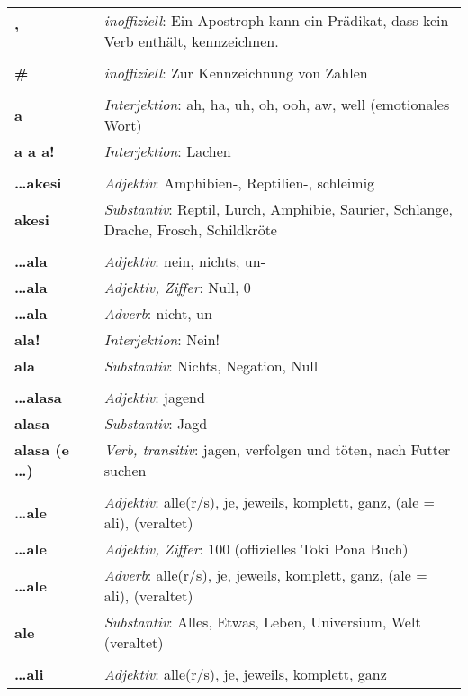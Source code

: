 \begin{supertabular}{p{2,5cm}|ll}
\textbf{'} && \textit{inoffiziell}: Ein Apostroph kann ein Prädikat, dass kein Verb enthält, kennzeichnen.  \\ 
 && \\ %
\textbf{\#} && \textit{inoffiziell}: Zur Kennzeichnung von Zahlen \\ 
 && \\ %
\textbf{a} && \textit{Interjektion}: ah, ha, uh, oh, ooh, aw, well  (emotionales Wort) \\ 
\textbf{a a a!} && \textit{Interjektion}: Lachen \\ 
 && \\ %
\textbf{\dots akesi} && \textit{Adjektiv}: Amphibien-, Reptilien-, schleimig \\ 
\textbf{akesi} && \textit{Substantiv}: Reptil, Lurch, Amphibie, Saurier, Schlange, Drache, Frosch, Schildkröte \\ 
 && \\ %
\textbf{\dots ala} && \textit{Adjektiv}: nein, nichts, un- \\ 
\textbf{\dots ala} && \textit{Adjektiv, Ziffer}: Null, 0 \\ 
\textbf{\dots ala} && \textit{Adverb}: nicht, un- \\ 
\textbf{ala!} && \textit{Interjektion}: Nein! \\ 
\textbf{ala} && \textit{Substantiv}: Nichts, Negation, Null \\ 
 && \\ %
\textbf{\dots alasa} && \textit{Adjektiv}: jagend \\ 
\textbf{alasa} && \textit{Substantiv}: Jagd \\ 
\textbf{alasa (e \dots)} && \textit{Verb, transitiv}: jagen, verfolgen und töten, nach Futter suchen \\ 
 && \\ %
\textbf{\dots ale} && \textit{Adjektiv}: alle(r/s), je, jeweils, komplett, ganz, (ale = ali), (veraltet) \\ 
\textbf{\dots ale} && \textit{Adjektiv, Ziffer}: 100 (offizielles Toki Pona Buch) \\ 
\textbf{\dots ale} && \textit{Adverb}: alle(r/s), je, jeweils, komplett, ganz, (ale = ali), (veraltet) \\ 
\textbf{ale} && \textit{Substantiv}:  Alles, Etwas, Leben, Universium, Welt (veraltet) \\ 
 && \\ %
\textbf{\dots ali} && \textit{Adjektiv}: alle(r/s), je, jeweils, komplett, ganz \\ 

\end{supertabular}
